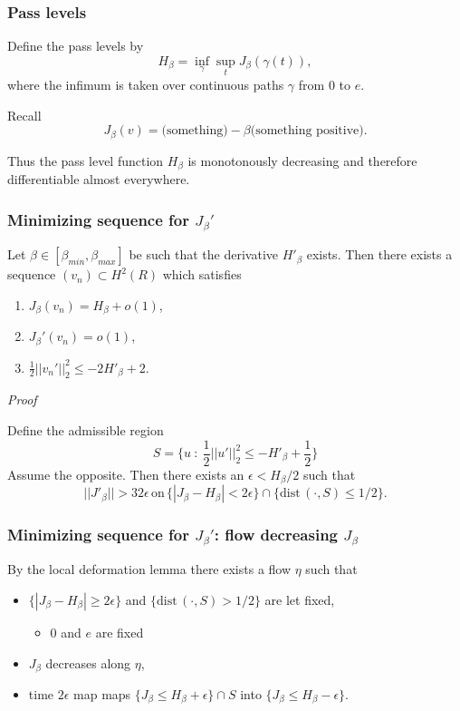 \documentclass[9pt, english]{beamer}
\theoremstyle{definition}
\newcommand{\dist}{\mathrm{dist\,}}             %
\begin{document}
\begin{frame}
\frametitle{Pass levels} Define the pass levels by
\[
H_\beta = \inf_\gamma \sup_{t} J_\beta(\gamma(t)),
\]
where the infimum is taken over continuous paths $\gamma$ from $0$
to $e$.


\pause Recall
\[
J_\beta(v) = \text{(something)} - \beta \text{(something positive)}.
\]

Thus the pass level function $H_\beta$ is monotonously decreasing
and therefore differentiable almost everywhere.
\end{frame}

\begin{frame}
\frametitle{Minimizing sequence for $J_\beta'$}
\begin{lemma}
Let $\beta \in [\beta_{min}, \beta_{max}]$ be such that the
derivative $H'_\beta$ exists. Then there exists a sequence $(v_n)
\subset H^2(R)$ which satisfies
\begin{enumerate}
\item $J_\beta(v_n) = H_\beta + o(1)$,
\item $J_\beta'(v_n) = o(1)$,
\item $\frac12 ||v_n'||_2^2 \leq -2H'_\beta + 2$.
\end{enumerate}
\end{lemma}
\pause \emph{Proof}

Define the admissible region
\[
S = \{ u\ :\ \frac12 || u' ||_2^2 \leq - H'_\beta + \frac12 \}
\]
Assume the opposite. Then there exists an $\epsilon <  H_\beta/2$
such that
\[
||J'_\beta|| > 32 \epsilon \, \text{on} \, \{ |J_\beta - H_\beta| <
2 \epsilon \} \cap \{ \dist(\cdot,S) \leq 1/2 \}.
\]
\end{frame}

\begin{frame}
\frametitle{Minimizing sequence for $J_\beta'$: flow decreasing
$J_\beta$} By the local deformation lemma there exists a flow $\eta$
such that
\begin{itemize}
\item $\{ |J_\beta - H_\beta| \geq 2 \epsilon \}$ and $\{ \dist(\cdot,S) > 1/2 \}$ are let fixed,
\begin{itemize}
\item<2-> {\color{red} $0$ and $e$ are fixed}
\end{itemize}
\item $J_\beta$ decreases along $\eta$,
\item time $2\epsilon$ map maps $\{ J_\beta \leq H_\beta + \epsilon\} \cap S$ into $\{J_\beta \leq H_\beta - \epsilon\}$.
\end{itemize}
\end{frame}
\end{document}
